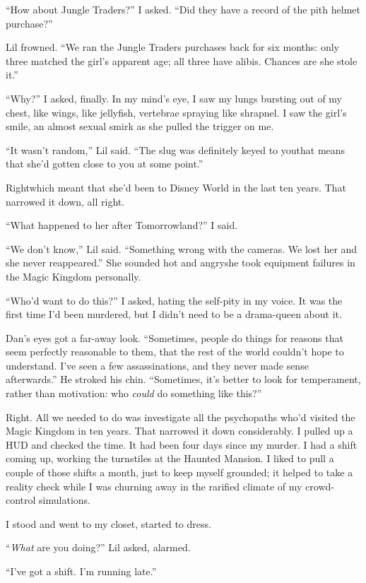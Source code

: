 “How about Jungle Traders?” I asked. “Did they have a record of the
pith helmet purchase?”

Lil frowned. “We ran the Jungle Traders purchases back for six
months: only three matched the girl's apparent age; all three have
alibis. Chances are she stole it.”

“Why?” I asked, finally. In my mind's eye, I saw my lungs bursting
out of my chest, like wings, like jellyfish, vertebrae spraying
like shrapnel. I saw the girl's smile, an almost sexual smirk as
she pulled the trigger on me.

“It wasn't random,” Lil said. “The slug was definitely keyed to
you{\dash}that means that she'd gotten close to you at some point.”

Right{\dash}which meant that she'd been to Disney World in the last ten
years. That narrowed it down, all right.

“What happened to her after Tomorrowland?” I said.

“We don't know,” Lil said. “Something wrong with the cameras. We
lost her and she never reappeared.” She sounded hot and angry{\dash}she
took equipment failures in the Magic Kingdom personally.

“Who'd want to do this?” I asked, hating the self-pity in my voice.
It was the first time I'd been murdered, but I didn't need to be a
drama-queen about it.

Dan's eyes got a far-away look. “Sometimes, people do things for
reasons that seem perfectly reasonable to them, that the rest of
the world couldn't hope to understand. I've seen a few
assassinations, and they never made sense afterwards.” He stroked
his chin. “Sometimes, it's better to look for temperament, rather
than motivation: who \emph{could} do something like this?”

Right. All we needed to do was investigate all the psychopaths
who'd visited the Magic Kingdom in ten years. That narrowed it down
considerably. I pulled up a HUD and checked the time. It had been
four days since my murder. I had a shift coming up, working the
turnstiles at the Haunted Mansion. I liked to pull a couple of
those shifts a month, just to keep myself grounded; it helped to
take a reality check while I was churning away in the rarified
climate of my crowd-control simulations.

I stood and went to my closet, started to dress.

“\emph{What} are you doing?” Lil asked, alarmed.

“I've got a shift. I'm running late.”

